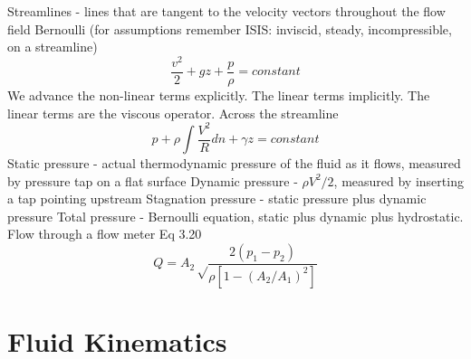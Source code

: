 \documentclass{article}
\begin{document}
Streamlines - lines that are tangent to the velocity vectors throughout the flow field
\newline
\newline
Bernoulli (for assumptions remember ISIS: inviscid, steady, incompressible, on a streamline)
\begin{equation}
  \frac{v^2}{2}+gz+\frac{p}{\rho}=constant
\end{equation}
We advance the non-linear terms explicitly. The linear terms
implicitly. The linear terms are the viscous operator. 
\newline
\newline
Across the streamline
\begin{equation}
    p + \rho\int\frac{V^2}{R}dn + \gamma z = constant
\end{equation}
\newline
\newline
Static pressure - actual thermodynamic pressure of the fluid as it flows, measured by pressure tap on a flat surface
\newline
\newline
Dynamic pressure - $\rho V^2/2$, measured by inserting a tap pointing upstream
\newline
\newline
Stagnation pressure - static pressure plus dynamic pressure
\newline
\newline
Total pressure - Bernoulli equation, static plus dynamic plus hydrostatic.
\newline
\newline
Flow through a flow meter Eq 3.20
\begin{equation}
    Q = A_2\sqrt\frac{2(p_1-p_2)}{\rho[1-(A_2/A_1)^2]}
\end{equation}


%
%
\newpage
\section{Fluid Kinematics}
\end{document}
